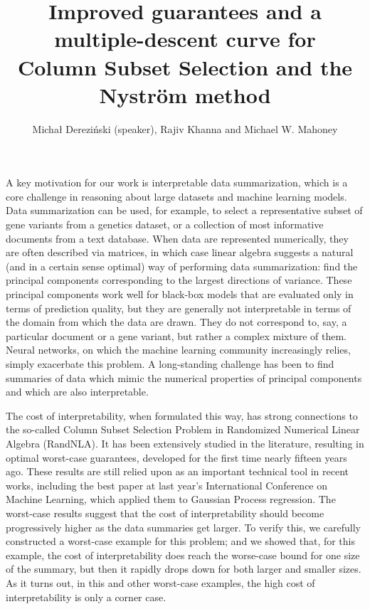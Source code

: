 \documentclass[11pt, oneside]{article}   	%
\title{Improved guarantees and a multiple-descent curve for \\
  Column Subset Selection %
  and the Nystr\"om method}
\author{Micha{\l} Derezi\'nski (speaker), Rajiv Khanna and Michael W. Mahoney}
\date{}							%
\begin{document}
\maketitle

A key motivation for our work is interpretable data summarization,
which is a core challenge in reasoning 
about large datasets and machine learning models.  Data summarization
can be used, for example, to select a representative subset of gene
variants from a genetics dataset, or a collection of most informative
documents from a text database.  When data are represented
numerically, they are often described via matrices, in which case
linear algebra suggests a natural (and in a certain sense optimal) way
of performing data summarization: find the principal components
corresponding to the largest directions of variance.  These principal
components work well for black-box models that are evaluated only in
terms of prediction quality, but they are generally not interpretable
in terms of the domain from which the data are drawn. They do not
correspond to, say, a particular document or a gene variant, but
rather a complex mixture of them.  Neural networks, on which the
machine learning community increasingly relies, simply exacerbate this
problem.  A long-standing challenge has been to find summaries of data
which mimic the numerical properties of principal components and which
are also interpretable. 

The cost of interpretability, when formulated this way, has strong
connections to the so-called Column Subset Selection Problem in
Randomized Numerical Linear Algebra (RandNLA). It
has been extensively studied in the literature, resulting in optimal
worst-case guarantees, developed for the first time nearly fifteen
years ago. These results are still relied upon as an important
technical tool in recent works, including the best paper at last
year’s International Conference on Machine Learning, which applied
them to Gaussian Process regression. The worst-case results suggest
that the cost of interpretability should become progressively higher
as the data summaries get larger.
To verify this, we carefully constructed a worst-case example for this problem; and we
showed that, for this example, the cost of interpretability does reach
the worse-case bound for one size of the summary, but then it rapidly
drops down for both larger and smaller sizes. As it turns out, in this and other
worst-case examples, the high cost of interpretability is only a
corner case.
\end{document}
